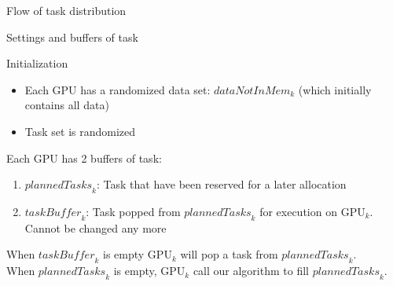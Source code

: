 \documentclass{libs/ufc_format}
\newcommand{\GPU}[1]{\ensuremath{\mathrm{GPU}_{#1}}\xspace}
\newcommand{\Dtouse}[1]{\ensuremath{\mathit{dataNotInMem}_{#1}}\xspace}
\newcommand{\plannedTasks}[1]{\ensuremath{\mathit{plannedTasks}_{#1}}\xspace}
\newcommand{\pulledTasks}[1]{\ensuremath{\mathit{taskBuffer}_{#1}}\xspace}
\begin{document}
\begin{frame}{Flow of task distribution}
\begin{figure}[tb]
{\begin{tikzpicture}[thick]
		\end{tikzpicture}
		}
\end{figure}
\end{frame}

\begin{frame}{Settings and buffers of task}
	\begin{alertblock}{Initialization}
		\begin{itemize}
			\item Each GPU has a randomized data set: \Dtouse{k} (which initially contains all data)
			\item Task set is randomized
		\end{itemize}
	\end{alertblock}
	\begin{alertblock}{Each GPU has 2 buffers of  task:}
		\begin{enumerate}
			\item \plannedTasks{k}: Task that have been reserved for a later allocation
			\item \pulledTasks{k}: Task popped from \plannedTasks{k} for execution on \GPU{k}. Cannot be changed any more
		\end{enumerate}
		When \pulledTasks{k} is empty \GPU{k} will pop a task from \plannedTasks{k}.\\
		When \plannedTasks{k} is empty, \GPU{k} call our algorithm to fill \plannedTasks{k}.
	\end{alertblock}
\end{frame}
\end{document}
